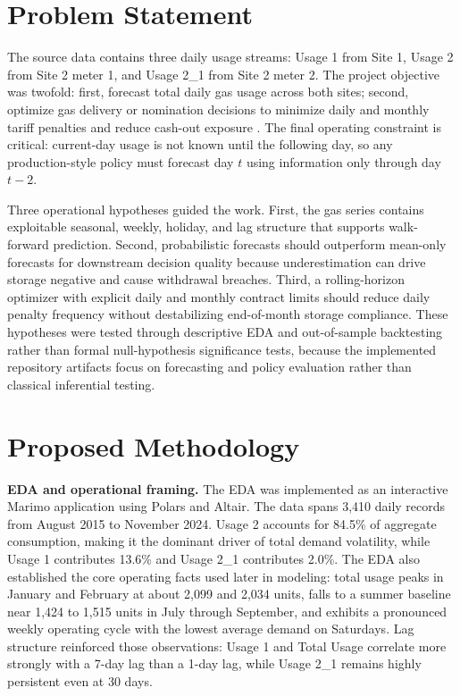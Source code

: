 \documentclass[10pt]{article}
\begin{document}
\section{Problem Statement}
The source data contains three daily usage streams: Usage 1 from Site 1, Usage 2 from Site 2 meter 1, and Usage 2\_1 from Site 2 meter 2. The project objective was twofold: first, forecast total daily gas usage across both sites; second, optimize gas delivery or nomination decisions to minimize daily and monthly tariff penalties and reduce cash-out exposure \citep{problem_statement, penalty_doc}. The final operating constraint is critical: current-day usage is not known until the following day, so any production-style policy must forecast day $t$ using information only through day $t-2$.

Three operational hypotheses guided the work. First, the gas series contains exploitable seasonal, weekly, holiday, and lag structure that supports walk-forward prediction. Second, probabilistic forecasts should outperform mean-only forecasts for downstream decision quality because underestimation can drive storage negative and cause withdrawal breaches. Third, a rolling-horizon optimizer with explicit daily and monthly contract limits should reduce daily penalty frequency without destabilizing end-of-month storage compliance. These hypotheses were tested through descriptive EDA and out-of-sample backtesting rather than formal null-hypothesis significance tests, because the implemented repository artifacts focus on forecasting and policy evaluation rather than classical inferential testing.

\section{Proposed Methodology}
\textbf{EDA and operational framing.} The EDA was implemented as an interactive Marimo application using Polars and Altair. The data spans 3,410 daily records from August 2015 to November 2024. Usage 2 accounts for 84.5\% of aggregate consumption, making it the dominant driver of total demand volatility, while Usage 1 contributes 13.6\% and Usage 2\_1 contributes 2.0\%. The EDA also established the core operating facts used later in modeling: total usage peaks in January and February at about 2,099 and 2,034 units, falls to a summer baseline near 1,424 to 1,515 units in July through September, and exhibits a pronounced weekly operating cycle with the lowest average demand on Saturdays. Lag structure reinforced those observations: Usage 1 and Total Usage correlate more strongly with a 7-day lag than a 1-day lag, while Usage 2\_1 remains highly persistent even at 30 days.
\end{document}
